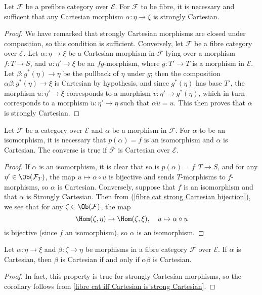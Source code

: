 \begin{proposition}\label{fibre cat iff Cartesian is strong Cartesian}
Let $\mathcal{F}$ be a prefibre category over $\mathcal{E}$. For $\mathcal{F}$ to be fibre, it is necessary and sufficent that any Cartesian morphism $\alpha:\eta\to \xi$ is strongly Cartesian.
\end{proposition}
\begin{proof}
We have remarked that strongly Cartesian morphisms are closed under composition, so this condition is sufficient. Conversely, let $\mathcal{F}$ be a fibre category over $\mathcal{E}$. Let $\alpha:\eta\to \xi$ be a Cartesian morphism in $\mathcal{F}$ lying over a morphism $f:T\to S$, and $u:\eta'\to \xi$ be an $fg$-morphism, where $g:T'\to T$ is a morphism in $\mathcal{E}$. Let $\beta:g^*(\eta)\to \eta$ be the pullback of $\eta$ under $g$; then the composition $\alpha\beta:g^*(\eta)\to \xi$ is Cartesian by hypothesis, and since $g^*(\eta)$ has base $T'$, the morphism $u:\eta'\to \xi$ corresponds to a morphism $\tilde{v}:\eta'\to g^*(\eta)$, which in turn corresponds to a morphism $\tilde{u}:\eta'\to \eta$ such that $\alpha\tilde{u}=u$. This then proves that $\alpha$ is strongly Cartesian.
\end{proof}
\begin{corollary}\label{fibre cat isomorphism iff image isomorphism and Cartesian}
Let $\mathcal{F}$ be a category over $\mathcal{E}$ and $\alpha$ be a morphism in $\mathcal{F}$. For $\alpha$ to be an isomorphism, it is necessary that $p(\alpha)=f$ is an isomorphism and $\alpha$ is Cartesian. The converse is true if $\mathcal{F}$ is Cartesian over $\mathcal{E}$.
\end{corollary}
\begin{proof}
If $\alpha$ is an isomorphism, it is clear that so is $p(\alpha)=f:T\to S$, and for any $\eta'\in\Ob(\mathcal{F}_T)$, the map $u\mapsto\alpha\circ u$ is bijective and sends $T$-morphisms to $f$-morphisms, so $\alpha$ is Cartesian. Conversely, suppose that $f$ is an isomorphism and that $\alpha$ is Strongly Cartesian. Then from (\ref{fibre cat strong Cartesian bijection}), we see that for any $\zeta\in\Ob(\mathcal{F})$, the map
\[\Hom(\zeta,\eta)\to \Hom(\zeta,\xi),\quad u\mapsto\alpha\circ u\]
is bijective (since $f$ an isomorphism), so $\alpha$ is an isomorphism.
\end{proof}
\begin{corollary}\label{fibre cat Cartesian iff Cartesian composition}
Let $\alpha:\eta\to \xi$ and $\beta:\zeta\to \eta$ be morphisms in a fibre category $\mathcal{F}$ over $\mathcal{E}$. If $\alpha$ is Cartesian, then $\beta$ is Cartesian if and only if $\alpha\beta$ is Cartesian.
\end{corollary}
\begin{proof}
In fact, this property is true for strongly Cartesian morphisms, so the corollary follows from \cref{fibre cat iff Cartesian is strong Cartesian}. 
\end{proof}

